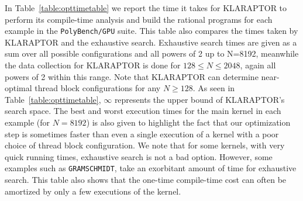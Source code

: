 In Table~\ref{table:opttimetable} we report the time it takes for 
KLARAPTOR to perform its compile-time analysis and build the rational programs
for each example in the \texttt{PolyBench/GPU} suite. This table also 
compares the times 
taken by KLARAPTOR and the exhaustive search.
Exhaustive search times are given as a sum over all possible configurations
and all powers of 2 up to N=8192, 
meanwhile the data collection for KLARAPTOR is done for $128 \leq N \leq 2048$, 
again all powers of 2 within this range.
Note that KLARAPTOR can determine near-optimal thread block configurations
for any $N \geq 128$. As seen in Table~\ref{table:opttimetable}, $\infty$ represents 
the upper bound of KLARAPTOR's search space. 
The best and worst execution times for the main kernel in each example
(for $N=8192$) is also given to highlight the fact that our optimization step
is sometimes faster than even a single execution of a kernel
with a poor choice of thread block configuration.
We note that for some kernels, with very quick running times,
exhaustive search is not a bad option. However, some examples such as
\texttt{GRAMSCHMIDT}, take an exorbitant amount of time for exhaustive search.
This table also shows that the one-time compile-time 
cost can often be amortized by only a few executions of the kernel.



%



%
%


%



